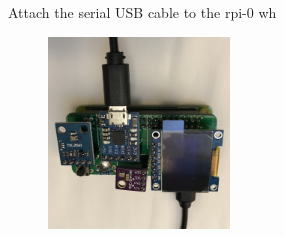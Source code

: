 \begin{frame}
   {Attach the serial USB cable to the rpi-0 wh}
   \begin{figure}[H]
      \centering
      \includegraphics[height=2in]{IMAGES/rpi0whsd-serial}
   \end{figure}
\end{frame}

\cprotect\note{


}

